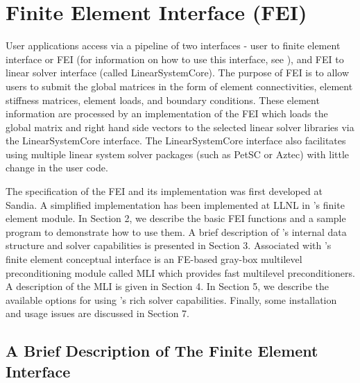 \chapter{Finite Element Interface (FEI)}
\label{Finite Element Interface}

User applications access \hypre{} via a pipeline of two interfaces - 
user to finite element interface or FEI (for information on how to
use this interface, see \cite{FEI-ref}),  and FEI to linear solver
interface (called {\sf LinearSystemCore}). The purpose of FEI is
to allow users to submit the global matrices in the form of element
connectivities, element stiffness matrices, element loads, and
boundary conditions. These element information are processed by an
implementation of the FEI which loads the global matrix and right
hand side vectors to the selected linear solver libraries via the
{\sf LinearSystemCore} interface.  The {\sf LinearSystemCore} 
interface also facilitates using multiple linear system solver
packages (such as PetSC or Aztec) with little change in the user code.

The specification of the FEI and its implementation was first
developed at Sandia. A simplified implementation has been implemented
at LLNL in \hypre{}'s finite element module. In Section 2, we describe
the basic FEI functions and a sample program to demonstrate how to
use them. A brief description of \hypre{}'s internal data structure 
and solver capabilities is presented in Section 3.  Associated with 
\hypre{}'s finite element conceptual interface is an FE-based gray-box
multilevel preconditioning module called {\sf MLI} which provides fast
multilevel preconditioners.  A description of the {\sf MLI} is given 
in Section 4.  In Section 5, we describe the available options for
using \hypre{}'s rich solver capabilities.  Finally, some
installation and usage issues are discussed in Section 7.

\section{A Brief Description of The Finite Element Interface}
                                                                                
